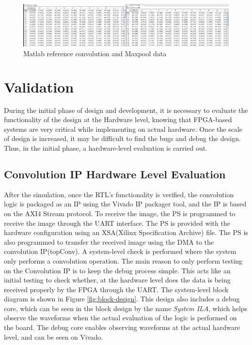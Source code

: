     \begin{figure}
        \centering
        \includegraphics[width=\linewidth]{images/matlabConvMaxRefdata.png}
        \caption{Matlab reference convolution and Maxpool data}
        \label{fig:matlabMaxpool}
    \end{figure}
    
    
    \section{Validation}
    \noindent
    During the initial phase of design and development, it is necessary to evaluate the functionality of the design at the Hardware level, knowing that FPGA-based systems are very critical while implementing on actual hardware. Once the scale of design is increased, it may be difficult to find the bugs and debug the design. Thus, in the initial phase, a hardware-level evaluation is carried out.
    \subsection{Convolution IP Hardware Level Evaluation}
    \noindent
    After the simulation, once the RTL's functionality is verified, the convolution logic is packaged as an IP using the Vivado IP packager tool, and the IP is based on the AXI4 Stream protocol. To receive the image, the PS is programmed to receive the image through the UART interface. The PS is provided with the hardware configuration using an XSA(Xilinx Specification Archive) file. The PS is also programmed to transfer the received image using the DMA to the convolution IP(topConv). A system-level check is performed where the system only performs a convolution operation. The main reason to only perform testing on the Convolution IP is to keep the debug process simple. This acts like an initial testing to check whether, at the hardware level does the data is being received properly by the FPGA through the UART. The system-level block diagram is shown in Figure \ref{fig:block-design}. This design also includes a debug core, which can be seen in the block design by the name \textit{System ILA}, which helps observe the waveforms when the actual evaluation of the logic is performed on the board. The debug core enables observing waveforms at the actual hardware level, and can be seen on Vivado. 

